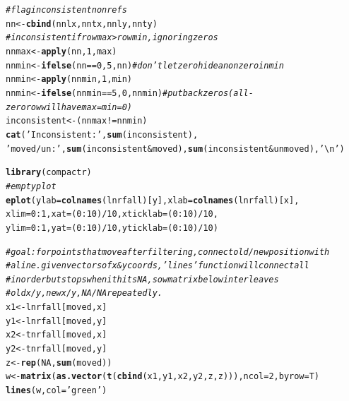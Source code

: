 \documentclass{article}\usepackage[]{graphicx}\usepackage[]{color}
\makeatletter
\newcommand{\hlnum}[1]{\textcolor[rgb]{0.686,0.059,0.569}{#1}}%
\newcommand{\hlstr}[1]{\textcolor[rgb]{0.192,0.494,0.8}{#1}}%
\newcommand{\hlcom}[1]{\textcolor[rgb]{0.678,0.584,0.686}{\textit{#1}}}%
\newcommand{\hlopt}[1]{\textcolor[rgb]{0,0,0}{#1}}%
\newcommand{\hlstd}[1]{\textcolor[rgb]{0.345,0.345,0.345}{#1}}%
\newcommand{\hlkwb}[1]{\textcolor[rgb]{0.69,0.353,0.396}{#1}}%
\newcommand{\hlkwc}[1]{\textcolor[rgb]{0.333,0.667,0.333}{#1}}%
\newcommand{\hlkwd}[1]{\textcolor[rgb]{0.737,0.353,0.396}{\textbf{#1}}}%
\newenvironment{kframe}{%
 \def\at@end@of@kframe{}%
 \ifinner\ifhmode%
  \def\at@end@of@kframe{\end{minipage}}%
  \begin{minipage}{\columnwidth}%
 \fi\fi%
 \def\FrameCommand##1{\hskip\@totalleftmargin \hskip-\fboxsep
 \colorbox{shadecolor}{##1}\hskip-\fboxsep
     \hskip-\linewidth \hskip-\@totalleftmargin \hskip\columnwidth}%
 \MakeFramed {\advance\hsize-\width
   \@totalleftmargin\z@ \linewidth\hsize
   \@setminipage}}%
 {\par\unskip\endMakeFramed%
 \at@end@of@kframe}
\newenvironment{knitrout}{}{} %
\makeatother
\begin{document}
\begin{knitrout}
\begin{kframe}
\begin{alltt}
  \hlcom{# flag inconsistent nonrefs}
  \hlstd{nn} \hlkwb{<-} \hlkwd{cbind}\hlstd{(nnlx, nntx, nnly, nnty)}
  \hlcom{# inconsistent if row max > row min, ignoring zeros}
  \hlstd{nnmax} \hlkwb{<-} \hlkwd{apply}\hlstd{(nn,}\hlnum{1}\hlstd{,max)}
  \hlstd{nnmin} \hlkwb{<-} \hlkwd{ifelse}\hlstd{(nn}\hlopt{==}\hlnum{0}\hlstd{,}\hlnum{5}\hlstd{,nn)} \hlcom{# don't let zero hide a nonzero in min}
  \hlstd{nnmin} \hlkwb{<-} \hlkwd{apply}\hlstd{(nnmin,}\hlnum{1}\hlstd{,min)}
  \hlstd{nnmin} \hlkwb{<-} \hlkwd{ifelse}\hlstd{(nnmin}\hlopt{==}\hlnum{5}\hlstd{,}\hlnum{0}\hlstd{,nnmin)} \hlcom{# put back zeros (all-zero row will have max=min=0)}
  \hlstd{inconsistent} \hlkwb{<-} \hlstd{(nnmax} \hlopt{!=} \hlstd{nnmin)}
  \hlkwd{cat}\hlstd{(}\hlstr{'Inconsistent:'}\hlstd{,} \hlkwd{sum}\hlstd{(inconsistent),}
      \hlstr{'moved/un:'}\hlstd{,} \hlkwd{sum}\hlstd{(inconsistent} \hlopt{&} \hlstd{moved),} \hlkwd{sum}\hlstd{(inconsistent} \hlopt{&} \hlstd{unmoved),} \hlstr{'\textbackslash{}n'}\hlstd{)}

  \hlkwd{library}\hlstd{(compactr)}
  \hlcom{# empty plot}
  \hlkwd{eplot}\hlstd{(}\hlkwc{ylab}\hlstd{=}\hlkwd{colnames}\hlstd{(lnrfall)[y],} \hlkwc{xlab}\hlstd{=}\hlkwd{colnames}\hlstd{(lnrfall)[x],}
        \hlkwc{xlim}\hlstd{=}\hlnum{0}\hlopt{:}\hlnum{1}\hlstd{,} \hlkwc{xat}\hlstd{=(}\hlnum{0}\hlopt{:}\hlnum{10}\hlstd{)}\hlopt{/}\hlnum{10}\hlstd{,} \hlkwc{xticklab}\hlstd{=(}\hlnum{0}\hlopt{:}\hlnum{10}\hlstd{)}\hlopt{/}\hlnum{10}\hlstd{,}
        \hlkwc{ylim}\hlstd{=}\hlnum{0}\hlopt{:}\hlnum{1}\hlstd{,} \hlkwc{yat}\hlstd{=(}\hlnum{0}\hlopt{:}\hlnum{10}\hlstd{)}\hlopt{/}\hlnum{10}\hlstd{,} \hlkwc{yticklab}\hlstd{=(}\hlnum{0}\hlopt{:}\hlnum{10}\hlstd{)}\hlopt{/}\hlnum{10} \hlstd{)}

  \hlcom{# goal: for points that move after filtering, connect old/new position with }
  \hlcom{# a line.  given vectors of x & y coords, 'lines' function will connect all}
  \hlcom{# in order but stops when it hits NA, so w matrix below interleaves }
  \hlcom{# old x/y, new x/y, NA/NA repeatedly.  }
  \hlstd{x1} \hlkwb{<-} \hlstd{lnrfall[moved,x]}
  \hlstd{y1} \hlkwb{<-} \hlstd{lnrfall[moved,y]}
  \hlstd{x2} \hlkwb{<-} \hlstd{tnrfall[moved,x]}
  \hlstd{y2} \hlkwb{<-} \hlstd{tnrfall[moved,y]}
  \hlstd{z}  \hlkwb{<-} \hlkwd{rep}\hlstd{(}\hlnum{NA}\hlstd{,}\hlkwd{sum}\hlstd{(moved))}
  \hlstd{w}  \hlkwb{<-} \hlkwd{matrix}\hlstd{(}\hlkwd{as.vector}\hlstd{(}\hlkwd{t}\hlstd{(}\hlkwd{cbind}\hlstd{(x1,y1,x2,y2,z,z))),}\hlkwc{ncol}\hlstd{=}\hlnum{2}\hlstd{,}\hlkwc{byrow}\hlstd{=T)}
  \hlkwd{lines}\hlstd{(w,}\hlkwc{col}\hlstd{=}\hlstr{'green'}\hlstd{)}


\end{alltt}
\end{kframe}
\end{knitrout}
\end{document}
